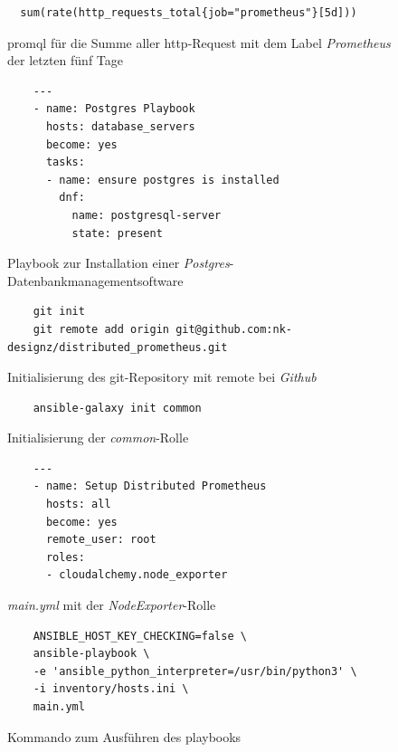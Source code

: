 \documentclass[11pt,a4paper]{article}
\begin{document}
\begin{figure}[!htbp]
  \begin{lstlisting}
  sum(rate(http_requests_total{job="prometheus"}[5d]))
  \end{lstlisting}
  \caption{
    \gls{promql} für die Summe aller \gls{http}-Request mit dem Label
    \emph{Prometheus} der letzten fünf Tage
  }
  \label{figure:promql}
\end{figure}

\begin{figure}[!htbp]
  \begin{lstlisting}
    ---
    - name: Postgres Playbook
      hosts: database_servers
      become: yes
      tasks:
      - name: ensure postgres is installed
        dnf:
          name: postgresql-server
          state: present
    \end{lstlisting}
  \caption{ Playbook zur Installation einer \emph{Postgres}-Datenbankmanagementsoftware}
  \label{figure:inv}
\end{figure}

\begin{figure}[!htbp]
  \begin{lstlisting}
    git init
    git remote add origin git@github.com:nk-designz/distributed_prometheus.git
  \end{lstlisting}
  \caption{Initialisierung des git-Repository mit \gls{remote} bei \emph{Github}}
  \label{figure:git}
\end{figure}

\begin{figure}[!htbp]
  \begin{lstlisting}
    ansible-galaxy init common
  \end{lstlisting}
  \caption{Initialisierung der \emph{common}-Rolle}
  \label{figure:galaxy}
\end{figure}

\begin{figure}[!htbp]
  \begin{lstlisting}
    ---
    - name: Setup Distributed Prometheus
      hosts: all
      become: yes
      remote_user: root
      roles:
      - cloudalchemy.node_exporter
    \end{lstlisting}
  \caption{\emph{main.yml} mit der \emph{NodeExporter}-Rolle}
  \label{figure:playbook}
\end{figure}

\begin{figure}[!htbp]
  \begin{lstlisting}
    ANSIBLE_HOST_KEY_CHECKING=false \
    ansible-playbook \
    -e 'ansible_python_interpreter=/usr/bin/python3' \
    -i inventory/hosts.ini \
    main.yml
  \end{lstlisting}
  \caption{Kommando zum Ausführen des \gls{playbooks}}
  \label{figure:ansible-command}
\end{figure}
\end{document}

